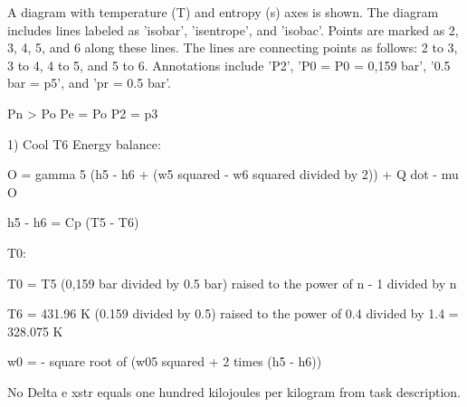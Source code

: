 A diagram with temperature (T) and entropy (s) axes is shown. The diagram includes lines labeled as 'isobar', 'isentrope', and 'isobac'. Points are marked as 2, 3, 4, 5, and 6 along these lines. The lines are connecting points as follows: 2 to 3, 3 to 4, 4 to 5, and 5 to 6. Annotations include 'P2', 'P0 = P0 = 0,159 bar', '0.5 bar = p5', and 'pr = 0.5 bar'.

Pn > Po
Pe = Po
P2 = p3

1) Cool T6
Energy balance:

O = gamma 5 (h5 - h6 + (w5 squared - w6 squared divided by 2)) + Q dot - mu O

h5 - h6 = Cp (T5 - T6)

T0:

T0 = T5 (0,159 bar divided by 0.5 bar) raised to the power of n - 1 divided by n

T6 = 431.96 K (0.159 divided by 0.5) raised to the power of 0.4 divided by 1.4 = 328.075 K

w0 = - square root of (w05 squared + 2 times (h5 - h6))

No Delta e xstr equals one hundred kilojoules per kilogram from task description.